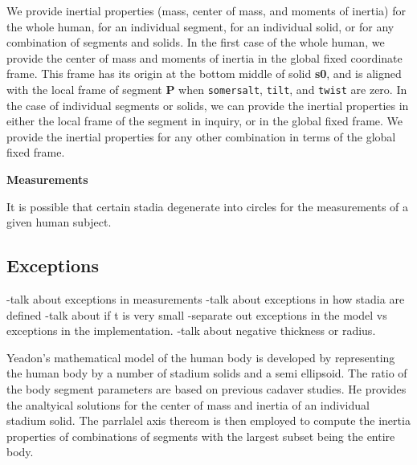 \documentclass[10pt]{article}
\begin{document}
We provide inertial properties (mass, center of mass, and moments of inertia)
for the whole human, for an individual segment, for an individual solid, or for
any combination of segments and solids. In the first case of the whole human,
 we provide the center of mass and moments of inertia in the global fixed coordinate frame. This frame has its
 origin at the bottom middle of solid \textbf{s0}, and is aligned with the
 local frame of segment \textbf{P} when \verb+somersalt+, \verb+tilt+, and
 \verb+twist+ are zero.
 In the case of individual segments or solids, we can provide the inertial
 properties in either the local frame of the segment in inquiry, or in the
 global fixed frame. We provide the inertial properties for any other
 combination in terms of the global fixed frame.







\textbf{Measurements}

It is possible that certain stadia degenerate into circles for the measurements
of a given human subject.


\subsection*{Exceptions}

-talk about exceptions in measurements
-talk about exceptions in how stadia are defined
-talk about if t is very small
-separate out exceptions in the model vs exceptions in the implementation.
-talk about negative thickness or radius.



Yeadon's mathematical model of the human body is developed by representing the
human body by a number of stadium solids and a semi ellipsoid. The ratio of the
body segment parameters are based on previous cadaver studies. He provides the
analtyical solutions for the center of mass and inertia of an individual
stadium solid. The parrlalel axis thereom is then employed to compute the
inertia properties of combinations of segments with the largest subset being
the entire body.


\end{document}
